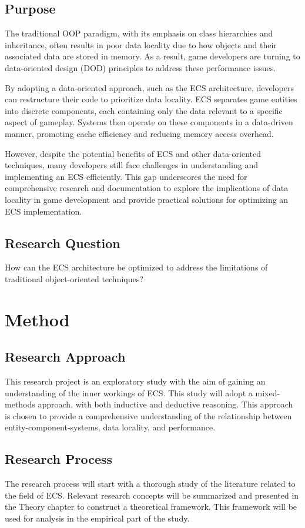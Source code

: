 \documentclass[openany, amssymb, psamsfonts]{amsart}
\theoremstyle{definition}
\numberwithin{equation}{section}
\begin{document}
\subsection{Purpose}
The traditional OOP paradigm, with its emphasis on class hierarchies and inheritance, often results in poor data locality due to how objects and their associated data are stored in memory. As a result, game developers are turning to data-oriented design (DOD) principles to address these performance issues.

By adopting a data-oriented approach, such as the ECS architecture, developers can restructure their code to prioritize data locality. ECS separates game entities into discrete components, each containing only the data relevant to a specific aspect of gameplay. Systems then operate on these components in a data-driven manner, promoting cache efficiency and reducing memory access overhead.

However, despite the potential benefits of ECS and other data-oriented techniques, many developers still face challenges in understanding and implementing an ECS efficiently. This gap underscores the need for comprehensive research and documentation to explore the implications of data locality in game development and provide practical solutions for optimizing an ECS implementation.

\subsection{Research Question}
How can the ECS architecture be optimized to address the limitations of traditional object-oriented techniques?

\section{Method}
\subsection{Research Approach}
This research project is an exploratory study with the aim of gaining an understanding of the inner workings of ECS. This study will adopt a mixed-methods approach, with both inductive and deductive reasoning. This approach is chosen to provide a comprehensive understanding of the relationship between entity-component-systems, data locality, and performance.

\subsection{Research Process}
The research process will start with a thorough study of the literature related to the field of ECS. Relevant research concepts will be summarized and presented in the Theory chapter to construct a theoretical framework. This framework will be used for analysis in the empirical part of the study.
\end{document}
